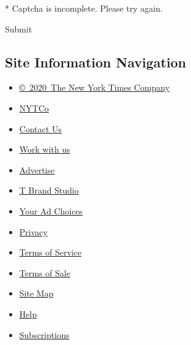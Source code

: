 * Captcha is incomplete. Please try again.

Submit

\hypertarget{site-information-navigation}{%
\subsection{Site Information
Navigation}\label{site-information-navigation}}

\begin{itemize}
\tightlist
\item
  \href{https://help.nytimes.com/hc/en-us/articles/115014792127-Copyright-notice}{©~2020~The
  New York Times Company}
\end{itemize}

\begin{itemize}
\tightlist
\item
  \href{https://www.nytco.com/}{NYTCo}
\item
  \href{https://help.nytimes.com/hc/en-us/articles/115015385887-Contact-Us}{Contact
  Us}
\item
  \href{https://www.nytco.com/careers/}{Work with us}
\item
  \href{https://nytmediakit.com/}{Advertise}
\item
  \href{http://www.tbrandstudio.com/}{T Brand Studio}
\item
  \href{https://www.nytimes.com/privacy/cookie-policy\#how-do-i-manage-trackers}{Your
  Ad Choices}
\item
  \href{https://www.nytimes.com/privacy}{Privacy}
\item
  \href{https://help.nytimes.com/hc/en-us/articles/115014893428-Terms-of-service}{Terms
  of Service}
\item
  \href{https://help.nytimes.com/hc/en-us/articles/115014893968-Terms-of-sale}{Terms
  of Sale}
\item
  \href{https://spiderbites.nytimes.com}{Site Map}
\item
  \href{https://help.nytimes.com/hc/en-us}{Help}
\item
  \href{https://www.nytimes.com/subscription?campaignId=37WXW}{Subscriptions}
\end{itemize}
